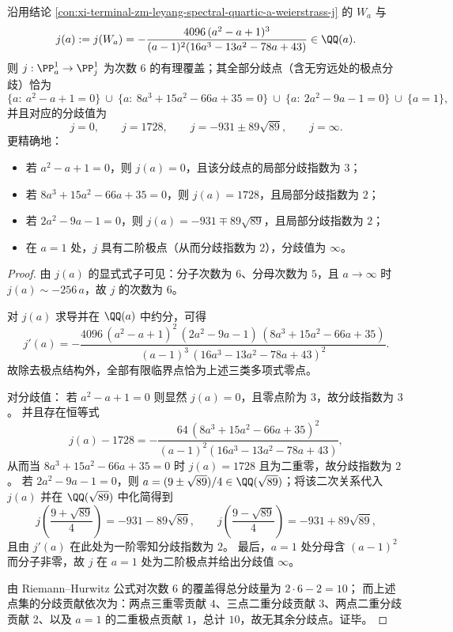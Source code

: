 \begin{theorem}\label{thm:xi-terminal-zm-leyang-spectral-quartic-a-j-ramification-spectrum}
沿用结论 \ref{con:xi-terminal-zm-leyang-spectral-quartic-a-weierstrass-j} 的 \(W_a\) 与
\[
j(a):=j(W_a)= -\frac{4096\,(a^2-a+1)^3}{(a-1)^2(16a^3-13a^2-78a+43)}\in\QQ(a).
\]
则 \(j:\PP^1_a\to\PP^1_j\) 为次数 \(6\) 的有理覆盖；其全部分歧点（含无穷远处的极点分歧）恰为
\[
\{a:\ a^2-a+1=0\}\ \cup\ \{a:\ 8a^3+15a^2-66a+35=0\}\ \cup\ \{a:\ 2a^2-9a-1=0\}\ \cup\ \{a=1\},
\]
并且对应的分歧值为
\[
j=0,\qquad j=1728,\qquad j=-931\pm 89\sqrt{89},\qquad j=\infty.
\]
更精确地：
\begin{itemize}
  \item 若 \(a^2-a+1=0\)，则 \(j(a)=0\)，且该分歧点的局部分歧指数为 \(3\)；
  \item 若 \(8a^3+15a^2-66a+35=0\)，则 \(j(a)=1728\)，且局部分歧指数为 \(2\)；
  \item 若 \(2a^2-9a-1=0\)，则 \(j(a)=-931\mp 89\sqrt{89}\)，且局部分歧指数为 \(2\)；
  \item 在 \(a=1\) 处，\(j\) 具有二阶极点（从而分歧指数为 \(2\)），分歧值为 \(\infty\)。
\end{itemize}
\end{theorem}
\begin{proof}
由 \(j(a)\) 的显式式子可见：分子次数为 \(6\)、分母次数为 \(5\)，且 \(a\to\infty\) 时 \(j(a)\sim -256\,a\)，故 \(j\) 的次数为 \(6\)。
\par
对 \(j(a)\) 求导并在 \(\QQ(a)\) 中约分，可得
\[
j'(a)= -\frac{4096\,(a^2-a+1)^2\,(2a^2-9a-1)\,(8a^3+15a^2-66a+35)}
{(a-1)^3\,(16a^3-13a^2-78a+43)^2}.
\]
故除去极点结构外，全部有限临界点恰为上述三类多项式零点。
\par
对分歧值：
若 \(a^2-a+1=0\) 则显然 \(j(a)=0\)，且零点阶为 \(3\)，故分歧指数为 \(3\)。
并且存在恒等式
\[
j(a)-1728
= -\frac{64\,(8a^3+15a^2-66a+35)^2}{(a-1)^2(16a^3-13a^2-78a+43)},
\]
从而当 \(8a^3+15a^2-66a+35=0\) 时 \(j(a)=1728\) 且为二重零，故分歧指数为 \(2\)。
若 \(2a^2-9a-1=0\)，则 \(a=(9\pm\sqrt{89})/4\in\QQ(\sqrt{89})\)；将该二次关系代入 \(j(a)\) 并在 \(\QQ(\sqrt{89})\) 中化简得到
\[
j\!\left(\frac{9+\sqrt{89}}{4}\right)=-931-89\sqrt{89},\qquad
j\!\left(\frac{9-\sqrt{89}}{4}\right)=-931+89\sqrt{89},
\]
且由 \(j'(a)\) 在此处为一阶零知分歧指数为 \(2\)。
最后，\(a=1\) 处分母含 \((a-1)^2\) 而分子非零，故 \(j\) 在 \(a=1\) 处为二阶极点并给出分歧值 \(\infty\)。
\par
由 Riemann--Hurwitz 公式对次数 \(6\) 的覆盖得总分歧量为 \(2\cdot 6-2=10\)；
而上述点集的分歧贡献依次为：两点三重零贡献 \(4\)、三点二重分歧贡献 \(3\)、两点二重分歧贡献 \(2\)、以及 \(a=1\) 的二重极点贡献 \(1\)，总计 \(10\)，故无其余分歧点。证毕。
\end{proof}


